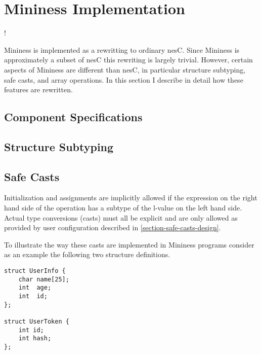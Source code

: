 \chapter{Mininess Implementation}
\label{chapter-mininess-implementation}

\lstset{language=nesC}
\lstMakeShortInline!

Mininess is implemented as a rewritting to ordinary nesC. Since Mininess is approximately a
subset of nesC this rewriting is largely trivial. However, certain aspects of Mininess are
different than nesC, in particular structure subtyping, safe casts, and array operations. In
this section I describe in detail how these features are rewritten.

\section{Component Specifications}
\label{section-component-specifications-implementation}


\section{Structure Subtyping}
\label{section-structure-subtyping-implementation}


\section{Safe Casts}
\label{section-safe-casts-implementation}

Initialization and assignments are implicitly allowed if the expression on the right hand side
of the operation has a subtype of the l-value on the left hand side. Actual type conversions
(casts) must all be explicit and are only allowed as provided by user configuration described in
\autoref{section-safe-casts-design}.

To illustrate the way these casts are implemented in Mininess programs consider as an example
the following two structure definitions.

\singlespace
\begin{lstlisting}[language=nesC]
struct UserInfo {
    char name[25];
    int  age;
    int  id;
};

struct UserToken {
    int id;
    int hash;
};
\end{lstlisting}
\primaryspacing


